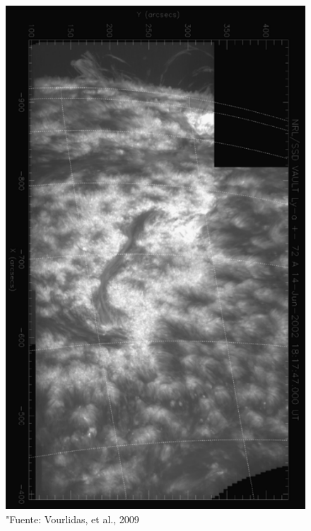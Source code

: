 \documentclass[9pt]{book}
\begin{document}
\begin{figure}[h]
\centering
\includegraphics[scale=0.6]{vault_complete}
\caption{"Fuente: Vourlidas, et al., 2009}
\label{fig:vault_complete}
\end{figure}
\end{document}
